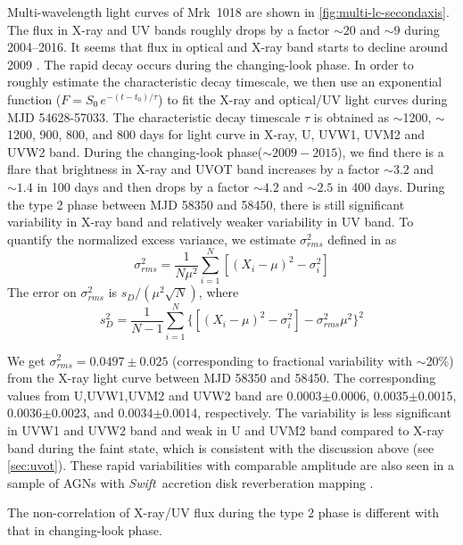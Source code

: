 \documentclass[twocolumn]{aastex63}
\newcommand{\swift}{{\small \it Swift}}
\begin{document}
 
Multi-wavelength light curves of Mrk~1018 are shown in \autoref{fig:multi-lc-secondaxis}. The flux in X-ray and UV bands roughly drops by a factor $\sim20$ and $\sim9$ during 2004--2016. It seems that flux in optical and X-ray band starts to decline around 2009 \citep[see the optical light curve in ][]{2016A&A...593L...8M}. The rapid decay occurs during the changing-look phase. In order to roughly estimate the characteristic decay timescale, we then use an exponential function ($F=S_0\,e^{-(t-t_0)/\tau }$) to fit the X-ray and optical/UV light curves during MJD 54628-57033. The characteristic decay timescale $\tau$ is obtained as $\sim$1200, $\sim$1200, 900, 800, and 800 days for light curve in X-ray, U, UVW1, UVM2 and UVW2 band. During the changing-look phase($\sim 2009-2015$), we find there is a flare that brightness in X-ray and UVOT band increases by a factor $\sim3.2$ and $\sim1.4$ in 100 days and then drops by a factor $\sim4.2$ and $\sim2.5$ in 400 days. During the type 2 phase between MJD 58350 and 58450, there is still significant variability in X-ray band and relatively weaker variability in UV band. To quantify the normalized excess variance, we estimate $\sigma^2_{rms} $ defined in \citet{1999ApJ...524..667T} as
\begin{equation}
\sigma^2_{rms}=\frac{1}{N\mu^2}\sum_{i=1}^{N}[(X_i-\mu)^2-\sigma_i^2]
\end{equation}
The error on $\sigma^2_{rms}$ is $s_D/(\mu^2\sqrt{N})$, where \begin{equation}
s_D^2=\frac{1}{N-1}\sum_{i=1}^{N}\{[(X_i-\mu)^2-\sigma_i^2]-\sigma^2_{rms}\mu^2\}^2
\end{equation}

We get $\sigma^2_{rms} = 0.0497 \pm 0.025 $ (corresponding to fractional variability with $\sim$20\%) from the X-ray light curve between MJD 58350 and 58450. The corresponding values from U,UVW1,UVM2 and UVW2 band are 0.0003$\pm$0.0006, 0.0035$\pm$0.0015, 0.0036$\pm$0.0023, and 0.0034$\pm$0.0014, respectively. The variability is less significant in UVW1 and UVW2 band and weak in U and UVM2 band compared to X-ray band during the faint state, which is consistent with the discussion above (see \autoref{sec:uvot}). These rapid variabilities with comparable amplitude are also seen in a sample of AGNs with \swift \, accretion disk reverberation mapping \citep[see ][]{2019ApJ...870..123E}.

The non-correlation of X-ray/UV flux during the type 2 phase is different with that in changing-look phase.
\end{document}
